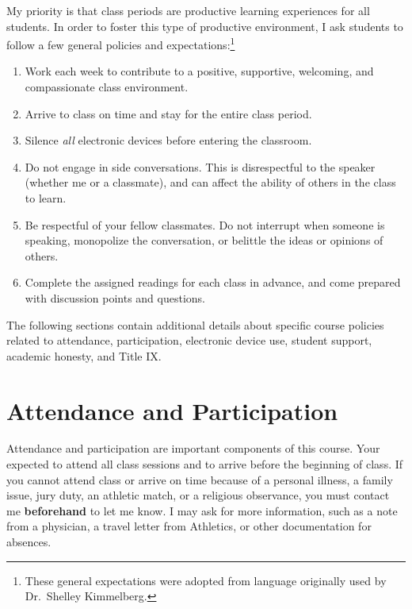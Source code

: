 \documentclass[]{book}
\providecommand{\tightlist}{%
  \setlength{\itemsep}{0pt}\setlength{\parskip}{0pt}}
\let\rmarkdownfootnote\footnote%
\def\footnote{\protect\rmarkdownfootnote}
\begin{document}
My priority is that class periods are productive learning experiences for all students. In order to foster this type of productive environment, I ask students to follow a few general policies and expectations:\footnote{These general expectations were adopted from language originally used by Dr.~Shelley Kimmelberg.}

\begin{enumerate}
\def\labelenumi{\arabic{enumi}.}
\tightlist
\item
  Work each week to contribute to a positive, supportive, welcoming, and compassionate class environment.
\item
  Arrive to class on time and stay for the entire class period.
\item
  Silence \emph{all} electronic devices before entering the classroom.
\item
  Do not engage in side conversations. This is disrespectful to the speaker (whether me or a classmate), and can affect the ability of others in the class to learn.
\item
  Be respectful of your fellow classmates. Do not interrupt when someone is speaking, monopolize the conversation, or belittle the ideas or opinions of others.
\item
  Complete the assigned readings for each class in advance, and come prepared with discussion points and questions.
\end{enumerate}

The following sections contain additional details about specific course policies related to attendance, participation, electronic device use, student support, academic honesty, and Title IX.

\hypertarget{attendance-and-participation}{%
\section{Attendance and Participation}\label{attendance-and-participation}}

Attendance and participation are important components of this course. Your expected to attend all class sessions and to arrive before the beginning of class. If you cannot attend class or arrive on time because of a personal illness, a family issue, jury duty, an athletic match, or a religious observance, you must contact me \textbf{beforehand} to let me know. I may ask for more information, such as a note from a physician, a travel letter from Athletics, or other documentation for absences.
\end{document}
